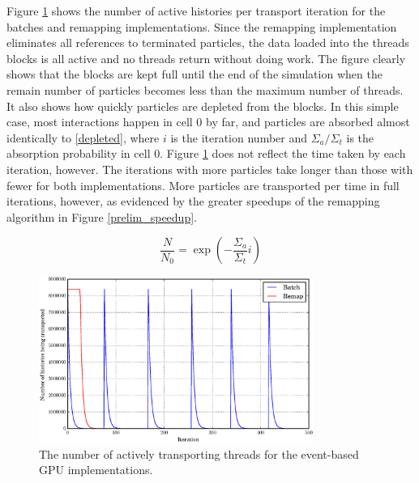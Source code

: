 Figure \ref{prelim_active} shows the number of active histories per transport iteration for the batches and remapping implementations.  Since the remapping implementation eliminates all references to terminated particles, the data loaded into the threads blocks is all active and no threads return without doing work.  The figure clearly shows that the blocks are kept full until the end of the simulation when the remain number of particles becomes less than the maximum number of threads.  It also shows how quickly particles are depleted from the blocks.  In this simple case, most interactions happen in cell 0 by far, and particles are absorbed almost identically to \eqref{depleted}, where $i$ is the iteration number and $\Sigma_a/\Sigma_t$ is the absorption probability in cell 0.   Figure \ref{prelim_active} does not reflect the time taken by each iteration, however.  The iterations with more particles take longer than those with fewer for both implementations.  More particles are transported per time in full iterations, however, as evidenced by the greater speedups of the remapping algorithm in Figure \ref{prelim_speedup}.

\begin{equation}
\label{depleted}
\frac{N}{N_0}=\exp \left(-\frac{\Sigma_a}{\Sigma_t} i \right)
\end{equation}

\begin{figure}[h!] 
  \centering
    \includegraphics[width=0.8\textwidth]{graphics/prelim_active.eps}
     \caption{The number of actively transporting threads for the event-based GPU implementations. \label{prelim_active} }
\end{figure}

